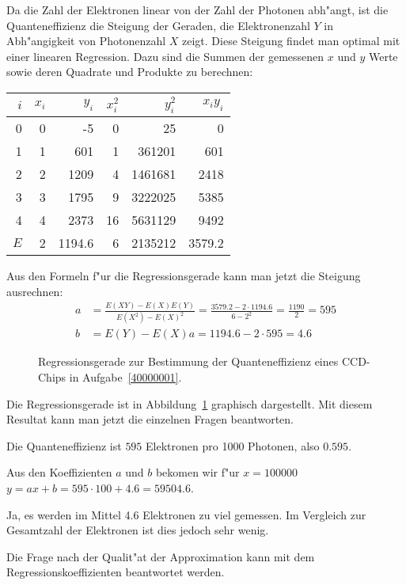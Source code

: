 \begin{loesung}
Da die Zahl der Elektronen linear von der Zahl der Photonen abh"angt,
ist die Quanteneffizienz die Steigung der Geraden, die Elektronenzahl $Y$
in Abh"angigkeit von Photonenzahl $X$ zeigt. Diese Steigung findet man
optimal mit einer linearen Regression. Dazu sind die Summen der gemessenen
$x$ und $y$ Werte sowie deren Quadrate und Produkte zu berechnen:
\begin{center}
\begin{tabular}{|r|rr|rr|r|}
\hline
$i$&$x_i$&$y_i$&$x_i^2$&$y_i^2$&$x_iy_i$\\
\hline
0&0&   -5&  0&     25&    0\\
1&1&  601&  1& 361201&  601\\
2&2& 1209&  4&1461681& 2418\\
3&3& 1795&  9&3222025& 5385\\
4&4& 2373& 16&5631129& 9492\\
\hline
$E$&2& 1194.6&6&2135212&3579.2\\
\hline
\end{tabular}
\end{center}
Aus den Formeln f"ur die Regressionsgerade kann man jetzt die
Steigung ausrechnen:
\begin{align*}
a&=\frac{E(XY)-E(X)E(Y)}{E(X^2)-E(X)^2}=
\frac{3579.2-2 \cdot 1194.6}{6-2^2}=\frac{1190}{2}=595
\\
b&=E(Y)-E(X)a=1194.6-2 \cdot 595=4.6
\end{align*}
\begin{figure}
\centering
{}
\caption{Regressionsgerade zur Bestimmung der Quanteneffizienz eines CCD-Chips
in Aufgabe~\ref{40000001}.
\label{40000001:graphik}}
\end{figure}
Die Regressionsgerade ist in Abbildung~\ref{40000001:graphik} graphisch
dargestellt.
Mit diesem Resultat kann man jetzt die einzelnen Fragen beantworten.
\begin{teilaufgaben}
\item Die Quanteneffizienz ist $595$ Elektronen pro 1000 Photonen, also
$0.595$.
\item
Aus den Koeffizienten $a$ und $b$ bekomen wir f"ur $x=100000$
$y=ax+b=595\cdot 100+4.6=59504.6$.
\item
Ja, es werden im Mittel 4.6 Elektronen zu viel gemessen. Im Vergleich
zur Gesamtzahl der Elektronen ist dies jedoch sehr wenig.
\item
Die Frage nach der Qualit"at der Approximation kann mit dem
Regressionskoeffizienten beantwortet werden.

\end{teilaufgaben}
\end{loesung}
